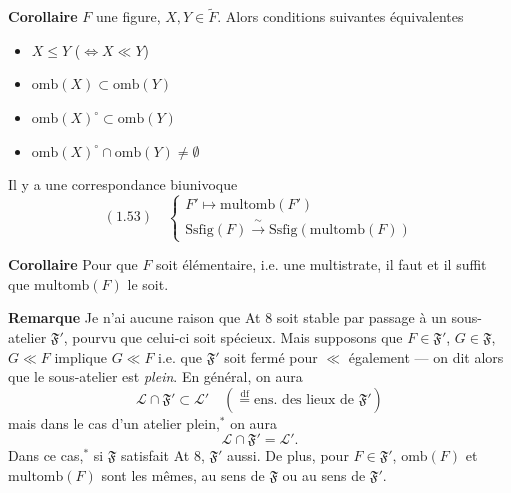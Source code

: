 \documentclass[11pt,a4paper]{article}
\begin{document}
\textbf{Corollaire}  $F$ une figure, $X, Y \in \widetilde{F}$. Alors conditions suivantes équivalentes
\begin{itemize}
  \item[a)] $X \leq Y$ \quad ($\Longleftrightarrow X \ll Y$)
\end{itemize}

\begin{itemize}
  \item[b)] $\mathrm{omb}(X) \subset \mathrm{omb}(Y)$
  \item[c)] $\mathrm{omb}(X)^{\circ} \subset \mathrm{omb}(Y)$
  \item[d)] $\mathrm{omb}(X)^{\circ} \cap \mathrm{omb}(Y) \neq \emptyset$
\end{itemize}
Il y a une correspondance biunivoque
\[
  (1.53) \quad \left\lbrace
  \begin{array}{c}
    F' \longmapsto \mathrm{multomb}(F') \\
    \mathrm{Ssfig}(F) \xrightarrow{\ \sim\ } \mathrm{Ssfig}(\mathrm{multomb}(F))
  \end{array}
  \right.
\]

\textbf{Corollaire} Pour que $F$ soit élémentaire, i.e. une multistrate, il faut et il suffit que $\mathrm{multomb}(F)$ le soit.

\textbf{Remarque} Je n'ai aucune raison que At 8 soit stable par passage à un sous-atelier $\mathfrak{F}'$, \struck{\ill{}} pourvu que celui-ci soit spécieux. Mais  supposons que  $F \in \mathfrak{F}'$, $G \in \mathfrak{F}$, $G \ll F$ implique $G \ll F$ i.e. que $\mathfrak{F}'$ soit fermé pour $\ll$ également --- on dit alors que le sous-atelier est \emph{plein}. En général, on aura
\[
  \mathcal{L} \cap \mathfrak{F}' \subset \mathcal{L}' \quad (\overset{\mathrm{df}}{=} \text{ens. des lieux de } \mathfrak{F}')
\]
mais dans le cas d'un atelier plein,$^{*}$ on aura
\[
  \mathcal{L} \cap \mathfrak{F}' = \mathcal{L}' .
\]
Dans ce cas,$^{*}$ si $\mathfrak{F}$ satisfait At 8, $\mathfrak{F}'$ aussi. De plus, \struck{---} pour $F \in \mathfrak{F}'$, $\mathrm{omb}(F)$ et $\mathrm{multomb}(F)$ sont les mêmes, au sens de $\mathfrak{F}$ ou au sens de $\mathfrak{F}'$.

\end{document}
